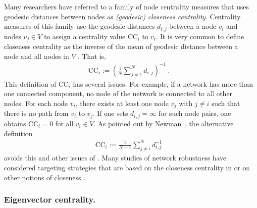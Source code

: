 \documentclass{comnet-mod}
\begin{document}
Many researchers have referred to a family of node centrality measures that uses geodesic distances between nodes as \textit{(geodesic) closeness centrality}. Centrality measures of this family use the geodesic distances $d_{i,j}$ between a node $v_i$ and nodes $v_{j}\in V$ to assign a centrality value $\textrm{CC}_i$ to $v_i$. It is very common to define closeness centrality as the inverse of the mean of geodesic distance between a node and all nodes in $V$ \cite[p.\,171]{Newman2018}. That is,
\begin{align}
	\textrm{CC}_i:=\left(\frac{1}{N}\sum_{j=1}^Nd_{i,j}\right)^{-1}\,.\label{eq:ccdef1}
\end{align}
This definition of $\textrm{CC}_i$ has several issues. For example, if a network has more than one connected component, no node of the network is connected to all other nodes. For each node $v_i$, there exists at least one node $v_{j}$ with $j \neq i$ such that there is no path from $v_i$ to $v_j$. If one sets $d_{i,j} = \infty$ for such node pairs, one obtains $\textrm{CC}_i = 0$ for all $v_i \in V$. As pointed out by Newman~\cite{Newman2018},
the alternative definition
\begin{align}
	\textrm{CC}_i:=\frac{1}{N-1}\sum_{j\neq i}^Nd_{i,j}^{-1} \nonumber
\end{align}
avoids this and other issues of  \cite[p.\,172]{Newman2018}. Many studies of network robustness have considered targeting strategies that are based on the closeness centrality in  \cite{Zhang2013, Ahmadi2015, Pinnaka2015, Agreste2016, Sun2017} or on other notions of closeness \cite{Feyessa2011, Iyer2013, Ventresca2014}.


\subsubsection{Eigenvector centrality.}\label{sec:eigenvector_centrality}
\end{document}

